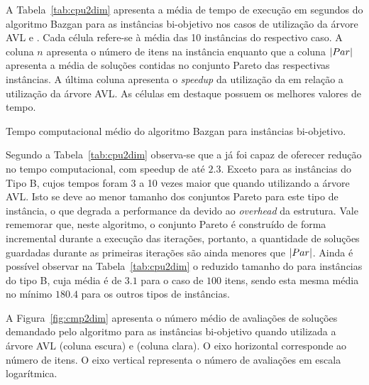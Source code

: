 
A Tabela~\ref{tab:cpu2dim} apresenta a média de tempo de execução em segundos
do algoritmo Bazgan para as instâncias bi-objetivo nos casos de utilização da
árvore AVL e .
Cada célula refere-se à média das 10 instâncias do respectivo caso.
A coluna $n$ apresenta o número de itens na instância enquanto que a
coluna $|Par|$ apresenta a média de soluções contidas no conjunto Pareto
das respectivas instâncias.
A última coluna apresenta o \emph{speedup} da utilização da  em relação
a utilização da árvore AVL.
As células em destaque possuem os melhores valores de tempo.

\begin{table}[h]
  \centering
  
  \caption{Tempo computacional médio do algoritmo Bazgan para instâncias bi-objetivo.}
  \label{tab:cpu2dim}
\end{table}

Segundo a Tabela~\ref{tab:cpu2dim} observa-se que a  já foi capaz de oferecer
redução no tempo computacional, com speedup de até $2.3$.
Exceto para as instâncias do Tipo B,
cujos tempos foram 3 a 10 vezes maior que quando utilizando a árvore AVL.
Isto se deve ao menor tamanho dos conjuntos Pareto para este tipo de instância,
o que degrada a performance da  devido ao \emph{overhead} da estrutura.
Vale rememorar que, neste algoritmo, o conjunto Pareto é construído de forma incremental
durante a execução das iterações, portanto, a quantidade de soluções guardadas
durante as primeiras iterações são ainda menores que $|Par|$.
Ainda é possível observar na Tabela~\ref{tab:cpu2dim} o reduzido tamanho do
\paretoset{} para instâncias do tipo B, cuja média é de $3.1$ para o caso de $100$ itens,
sendo esta mesma média no mínimo $180.4$ para os outros tipos de instâncias.


A Figura~\ref{fig:cmp2dim} apresenta o número médio de avaliações de soluções
demandado pelo algoritmo para as instâncias bi-objetivo quando
utilizada a árvore AVL (coluna escura) e  (coluna clara).
O eixo horizontal corresponde ao número de itens.
O eixo vertical representa o número de avaliações em escala logarítmica.

